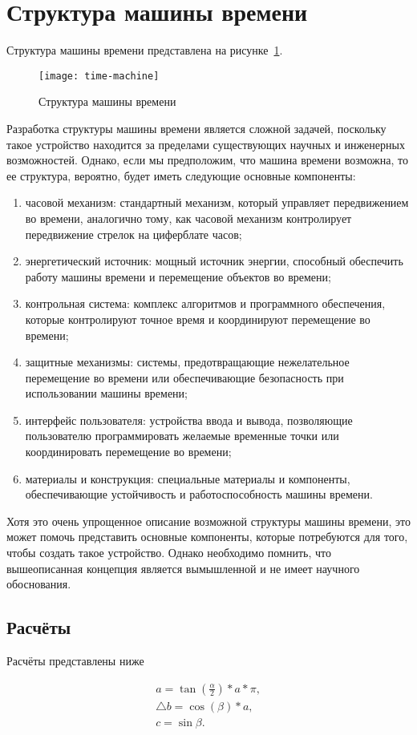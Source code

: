 \newpage

\section{Структура машины времени}

Структура машины времени представлена на рисунке~\ref{f:time-machine}.


\begin{figure}[ht]
	\centering
	\vspace{\toppaddingoffigure}
	\texttt{[image: time-machine]}
	\caption{Структура машины времени}
	\label{f:time-machine}
\end{figure}


Разработка структуры машины времени является сложной задачей, поскольку такое устройство находится за пределами существующих научных и инженерных возможностей. Однако, если мы предположим, что машина времени возможна, то ее структура, вероятно, будет иметь следующие основные компоненты:

\begin{enumerate}
	\item часовой механизм: стандартный механизм, который управляет передвижением во времени, аналогично тому, как часовой механизм контролирует передвижение стрелок на циферблате часов;

	\item энергетический источник: мощный источник энергии, способный обеспечить работу машины времени и перемещение объектов во времени;

	\item контрольная система: комплекс алгоритмов и программного обеспечения, которые контролируют точное время и координируют перемещение во времени;

	\item защитные механизмы: системы, предотвращающие нежелательное перемещение во времени или обеспечивающие безопасность при использовании машины времени;

	\item интерфейс пользователя: устройства ввода и вывода, позволяющие пользователю программировать желаемые временные точки или координировать перемещение во времени;

	\item материалы и конструкция: специальные материалы и компоненты, обеспечивающие устойчивость и работоспособность машины времени.
\end{enumerate}

Хотя это очень упрощенное описание возможной структуры машины времени, это может помочь представить основные компоненты, которые потребуются для того, чтобы создать такое устройство. Однако необходимо помнить, что вышеописанная концепция является вымышленной и не имеет научного обоснования.

\subsection{Расчёты}

Расчёты представлены ниже

\begin{gather}
	a = \tan(\frac{\alpha}{2})*a*\pi, \\
	\bigtriangleup b = \cos(\beta)*a, \\
	c = \sin{\beta}.
\end{gather}


\examplecommand
